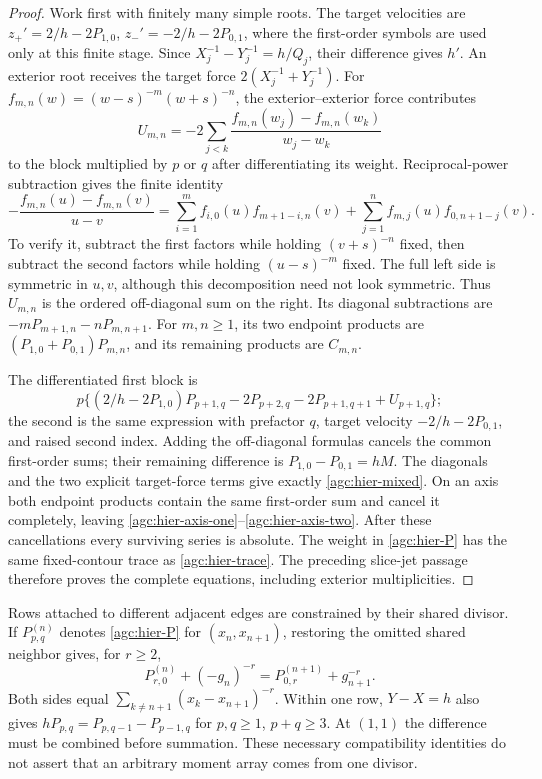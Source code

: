 \begin{proof}
Work first with finitely many simple roots. The target velocities are
$z_+'=2/h-2P_{1,0}$, $z_-'=-2/h-2P_{0,1}$, where the first-order
symbols are used only at this finite stage. Since
$X_j^{-1}-Y_j^{-1}=h/Q_j$, their difference gives $h'$.
An exterior root receives the target force
$2(X_j^{-1}+Y_j^{-1})$. For
$f_{m,n}(w)=(w-s)^{-m}(w+s)^{-n}$, the exterior--exterior force
contributes
\[
 U_{m,n}=-2\sum_{j<k}
             \frac{f_{m,n}(w_j)-f_{m,n}(w_k)}{w_j-w_k}
\]
to the block multiplied by $p$ or $q$ after differentiating its
weight. Reciprocal-power subtraction gives the finite identity
\begin{equation}
 -\frac{f_{m,n}(u)-f_{m,n}(v)}{u-v}
 =\sum_{i=1}^{m}f_{i,0}(u)f_{m+1-i,n}(v)
   +\sum_{j=1}^{n}f_{m,j}(u)f_{0,n+1-j}(v).
 \label{agc:hier-split-DD}
\end{equation}
To verify it, subtract the first factors while holding
$(v+s)^{-n}$ fixed, then subtract the second factors while
holding $(u-s)^{-m}$ fixed. The full left side is symmetric in
$u,v$, although this decomposition need not look symmetric.
Thus $U_{m,n}$ is the ordered off-diagonal sum on the right.
Its diagonal subtractions are $-mP_{m+1,n}-nP_{m,n+1}$.
For $m,n\ge1$, its two endpoint products are
$(P_{1,0}+P_{0,1})P_{m,n}$, and its remaining products are $C_{m,n}$.

The differentiated first block is
\[
 p\{(2/h-2P_{1,0})P_{p+1,q}
                  -2P_{p+2,q}-2P_{p+1,q+1}+U_{p+1,q}\};
\]
the second is the same expression with prefactor $q$, target
velocity $-2/h-2P_{0,1}$, and raised second index. Adding the
off-diagonal formulas cancels the common first-order sums; their
remaining difference is $P_{1,0}-P_{0,1}=hM$. The diagonals and
the two explicit target-force terms give exactly
\eqref{agc:hier-mixed}. On an axis both endpoint products contain
the same first-order sum and cancel it completely, leaving
\eqref{agc:hier-axis-one}--\eqref{agc:hier-axis-two}.
After these cancellations every surviving series is absolute.
The weight in \eqref{agc:hier-P} has the same fixed-contour trace
as \eqref{agc:hier-trace}. The preceding slice-jet passage therefore
proves the complete equations, including exterior multiplicities.
\end{proof}

Rows attached to different adjacent edges are constrained by their
shared divisor. If $P_{p,q}^{(n)}$ denotes \eqref{agc:hier-P} for
$(x_n,x_{n+1})$, restoring the omitted shared neighbor gives, for $r\ge2$,
\begin{equation}
 P_{r,0}^{(n)}+(-g_n)^{-r}
       =P_{0,r}^{(n+1)}+g_{n+1}^{-r}.
 \label{agc:hier-overlap}
\end{equation}
Both sides equal $\sum_{k\ne n+1}(x_k-x_{n+1})^{-r}$.
Within one row, $Y-X=h$ also gives
$hP_{p,q}=P_{p,q-1}-P_{p-1,q}$ for $p,q\ge1$,
$p+q\ge3$. At $(1,1)$ the difference must be combined before
summation. These necessary compatibility identities do not assert
that an arbitrary moment array comes from one divisor.

